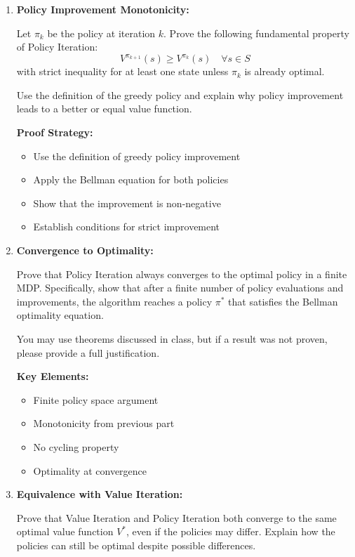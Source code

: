 \documentclass[12pt]{article}
\begin{document}
\begin{enumerate}[resume*]
\item \textbf{Policy Improvement Monotonicity:}
    
    Let \( \pi_k \) be the policy at iteration \( k \). Prove the following fundamental property of Policy Iteration:
    \[
    V^{\pi_{k+1}}(s) \geq V^{\pi_k}(s) \quad \forall s \in S
    \]
    with strict inequality for at least one state unless \( \pi_k \) is already optimal.
    
    Use the definition of the greedy policy and explain why policy improvement leads to a better or equal value function.
    
    \textbf{Proof Strategy:}
    \begin{itemize}
        \item Use the definition of greedy policy improvement
        \item Apply the Bellman equation for both policies
        \item Show that the improvement is non-negative
        \item Establish conditions for strict improvement
    \end{itemize}

    \item \textbf{Convergence to Optimality:}
    
    Prove that Policy Iteration always converges to the optimal policy in a finite MDP. Specifically, show that after a finite number of policy evaluations and improvements, the algorithm reaches a policy \( \pi^* \) that satisfies the Bellman optimality equation.
    
    You may use theorems discussed in class, but if a result was not proven, please provide a full justification.
    
    \textbf{Key Elements:}
    \begin{itemize}
        \item Finite policy space argument
        \item Monotonicity from previous part
        \item No cycling property
        \item Optimality at convergence
    \end{itemize}
    
    \item \textbf{Equivalence with Value Iteration:}
    
    Prove that Value Iteration and Policy Iteration both converge to the same optimal value function \( V^* \), even if the policies may differ. Explain how the policies can still be optimal despite possible differences.
    

\end{enumerate}
\end{document}
